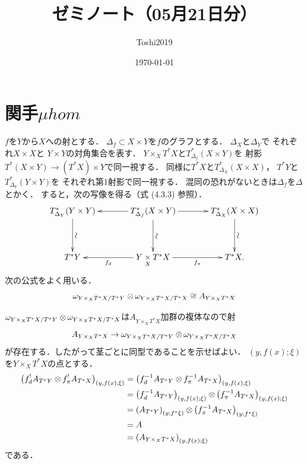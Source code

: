\documentclass[leqno, 10pt, a4paper, dvipdfmx]{jsarticle}
\title{ゼミノート（05月21日分）}
\author{Toshi2019}
\date{\today}
\makeatletter
\theoremstyle{definition}
\renewenvironment{proof}[1][\proofname]{\par
  \pushQED{\qed}%
  \normalfont \topsep6\p@\@plus6\p@\relax
  \trivlist
  \item[\hskip\labelsep
         \bfseries
    {#1}]\ignorespaces
}{%
  \popQED\endtrivlist\@endpefalse
}
\renewcommand{\proofname}{証明.}
\numberwithin{equation}{section}
\newcommand{\tens}[1][]{\mathbin{\otimes_{\raise1.5ex\hbox to-.1em{}{#1}}}}
\newcommand{\pb}[1][]{\mathbin{\mathop{\times}\limits_{#1}}}
\theoremstyle{mystyle}
\newcommand{\mpb}[1][]{{#1}_{\pi}} %
\newcommand{\mdiff}[1][]{{#1}_{d}} %
\newcommand{\cotb}[1][]{T^{\ast}{#1}}
\newcommand{\muhom}{\mu hom}
\newcommand{\mucat}[2][]{\mathsf{D}^{\mathrm{b}}_{#1}(#2)}
\newcommand{\diag}[1][]{\Delta_{#1}}
\makeatother
\begin{document}
\maketitle
\tableofcontents
\section{関手\(\muhom\)}
\(f\)を\(Y\)から\(X\)への射とする．
\(\diag[f]\subset X\times Y\)を\(f\)のグラフとする．
\(\diag[X]\)と\(\diag[Y]\)で
それぞれ\(X\times X\)と
\(Y\times Y\)の対角集合を表す．
\(Y\mathbin{\times_{X}}\cotb[X]\)と\(T^{\ast}_{\diag[f]}(X\times Y)\)を
射影\(\cotb[(X\times Y)]\to(\cotb[X])\times Y\)で同一視する．
同様に\(\cotb[X]\)と\(T^{\ast}_{\diag[X]}(X\times X)\)，
\(\cotb[Y]\)と\(T^{\ast}_{\diag[Y]}(Y\times Y)\)を
それぞれ第1射影で同一視する．
混同の恐れがないときは\(\diag[f]\)を\(\diag\)とかく．
すると，次の写像を得る（式 (4.3.3) 参照）．
\begin{equation}\label{eq:4.4.1}
  \vcenter{\xymatrix@C=36pt@R=36pt{
    T^{\ast}_{\diag[Y]}(Y\times Y)
    \ar[d]^-{\rotatebox{90}{\(\sim\)}}
    &
    T^{\ast}_{\diag[f]}(X\times Y)
    \ar[d]^-{\rotatebox{90}{\(\sim\)}}
    \ar[l]
    \ar[r]
    &
    T^{\ast}_{\diag[X]}(X\times X)
    \ar[d]^-{\rotatebox{90}{\(\sim\)}}
    \\
    \cotb[Y]
    &
    Y\pb[X]\cotb[X]
    \ar[l]^-{\mdiff[f]}
    \ar[r]_-{\mpb[f]}
    &
    \cotb[X].
  }}
\end{equation}
次の公式をよく用いる．
\begin{equation}\label{eq:4.4.2}
  \omega_{{Y\mathbin{\times_{X}}\cotb[X]}\mathbin{/}\cotb[Y]}
  \tens[]
  \omega_{{Y\mathbin{\times_{X}}\cotb[X]}\mathbin{/}\cotb[X]}
  \cong
  A_{Y\mathbin{\times_{X}}\cotb[X]}
\end{equation}
\begin{proof}
  \(
    \omega_{{Y\mathbin{\times_{X}}\cotb[X]}\mathbin{/}\cotb[Y]}
    \tens[]
    \omega_{{Y\mathbin{\times_{X}}\cotb[X]}\mathbin{/}\cotb[X]}
  \)は\(A_{Y\mathbin{\times_{X}}\cotb[X]}\)加群の複体なので射
  \[
    A_{Y\mathbin{\times_{X}}\cotb[X]}
    \to
    \omega_{{Y\mathbin{\times_{X}}\cotb[X]}\mathbin{/}\cotb[Y]}
    \tens[]
    \omega_{{Y\mathbin{\times_{X}}\cotb[X]}\mathbin{/}\cotb[X]}
  \]
  が存在する．したがって茎ごとに同型であることを示せばよい．
  \((y,f(x);\xi)\)を\(Y\mathbin{\times_{X}}\cotb[X]\)の点とする．
  \begin{align*}
    \left(
      \mdiff[f]^{!}A_{\cotb[Y]}\tens[]\mpb[f]^{!}A_{\cotb[X]}
    \right)_{(y,f(x);\xi)}
    &=\left(
      \mdiff[f]^{-1}A_{\cotb[Y]}\tens[]\mpb[f]^{-1}A_{\cotb[X]}
    \right)_{(y,f(x);\xi)}\\
    &=\left(\mdiff[f]^{-1}A_{\cotb[Y]}\right)_{(y,f(x);\xi)}
    \tens[]\left(\mpb[f]^{-1}A_{\cotb[X]}
    \right)_{(y,f(x);\xi)}\\
    &=\left(A_{\cotb[Y]}\right)_{(y;f^{\ast}\xi)}
    \tens[]\left(\mpb[f]^{-1}A_{\cotb[X]}
    \right)_{(y;f^{\ast}\xi)}\\
    &=A\\
    &=\left(A_{Y\mathbin{\times_{X}}\cotb[X]}\right)_{(y,f(x);\xi)}
  \end{align*}
  である．
\end{proof}
\end{document}
